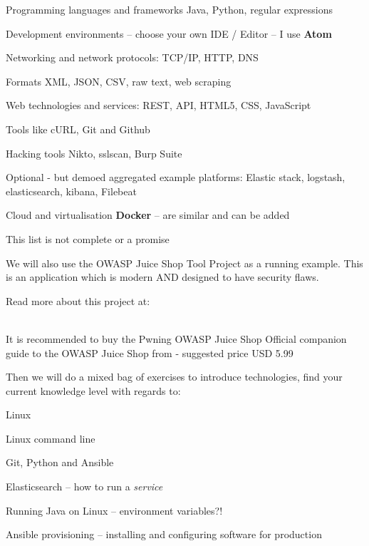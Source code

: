 \documentclass[Screen16to9,17pt]{foils}
\begin{document}
\begin{list2}
\item Programming languages and frameworks Java, Python, regular expressions
\item Development environments -- choose your own IDE / Editor -- I use {\bf Atom}
\item Networking and network protocols: TCP/IP, HTTP, DNS
\item Formats XML, JSON, CSV, raw text, web scraping
\item Web technologies and services: REST, API, HTML5, CSS, JavaScript
\item Tools like cURL, Git and Github
\item Hacking tools Nikto, sslscan, Burp Suite
\item Optional - but demoed aggregated example platforms: Elastic stack, logstash, elasticsearch, kibana, Filebeat
\item Cloud and virtualisation {\bf Docker} -- are similar and can be added
\end{list2}

\centerline{This list is not complete or a promise }



We will also use the OWASP Juice Shop Tool Project as a running example. This is an application which is modern AND designed to have security flaws.

Read more about this project at:\\
\\

It is recommended to buy the Pwning OWASP Juice Shop Official companion guide to the OWASP Juice Shop from  - suggested price USD 5.99



Then we will do a mixed bag of exercises to introduce technologies, find your current knowledge level with regards to:

\begin{list2}
\item Linux
\item Linux command line
\item Git, Python and Ansible
\item Elasticsearch -- how to run a \emph{service}
\item Running Java on Linux -- environment variables?!
\item Ansible provisioning -- installing and configuring software for production
\end{list2}
\end{document}
